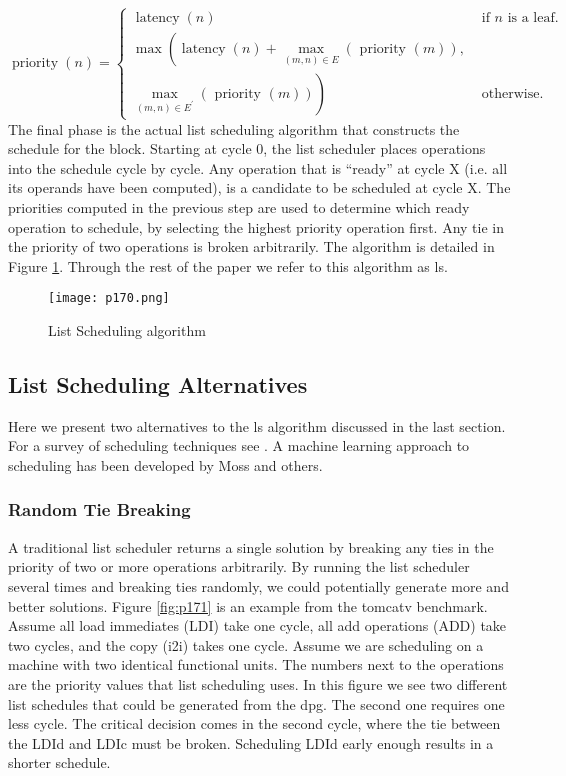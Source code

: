 $$
	\operatorname{priority}(n)=\left\{\begin{array}{cc}
		\operatorname{latency}(n)                                                                & \text { if } n \text { is a leaf. } \\
		\max \left(\operatorname{latency}(n)+\max _{(m, n) \in E}(\text { priority }(m)),\right. &                                     \\
		\left.\max _{(m, n) \in E^{\prime}}(\text { priority }(m))\right)                        & \text { otherwise. }
	\end{array}\right.
$$
The final phase is the actual list scheduling algorithm that constructs the schedule for the block. Starting
at cycle 0, the list scheduler places operations into the schedule cycle by cycle. Any operation that is “ready”
at cycle X (i.e. all its operands have been computed), is a candidate to be scheduled at cycle X. The priorities
computed in the previous step are used to determine which ready operation to schedule, by selecting the
highest priority operation first. Any tie in the priority of two operations is broken arbitrarily. The algorithm
is detailed in Figure \ref{fig:p170}. Through the rest of the paper we refer to this algorithm as ls.


\begin{figure}[H]
	\centering
	\texttt{[image: p170.png]}
	\caption{List Scheduling algorithm}
	\label{fig:p170}
\end{figure}


\subsection{List Scheduling Alternatives}

Here we present two alternatives to the ls algorithm discussed in the last section. For a survey of scheduling
techniques see . A machine learning approach to scheduling has been developed by Moss and others.



\subsubsection{Random Tie Breaking}

A traditional list scheduler returns a single solution by breaking any ties in the priority of two or more
operations arbitrarily. By running the list scheduler several times and breaking ties randomly, we could
potentially generate more and better solutions. Figure \ref{fig:p171} is an example from the tomcatv benchmark. Assume
all load immediates (LDI) take one cycle, all add operations (ADD) take two cycles, and the copy (i2i) takes
one cycle. Assume we are scheduling on a machine with two identical functional units. The numbers next
to the operations are the priority values that list scheduling uses. In this figure we see two different list
schedules that could be generated from the dpg. The second one requires one less cycle. The critical decision
comes in the second cycle, where the tie between the LDId and LDIc must be broken. Scheduling LDId early
enough results in a shorter schedule.


